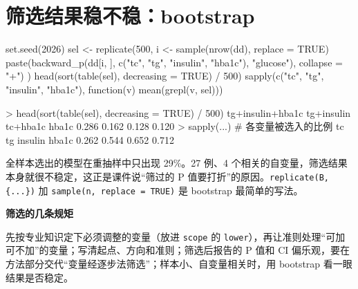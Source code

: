 \section{筛选结果稳不稳：bootstrap}
\begin{rcode}
set.seed(2026)
sel <- replicate(500, {
  i <- sample(nrow(dd), replace = TRUE)
  paste(backward_p(dd[i, ], c("tc", "tg", "insulin", "hba1c"), "glucose"), collapse = "+")
})
head(sort(table(sel), decreasing = TRUE) / 500)
sapply(c("tc", "tg", "insulin", "hba1c"), function(v) mean(grepl(v, sel)))
\end{rcode}
\begin{routput}
> head(sort(table(sel), decreasing = TRUE) / 500)
   tg+insulin+hba1c          tg+insulin            tc+hba1c               hba1c
              0.286               0.162               0.128               0.120
> sapply(...)           # 各变量被选入的比例
     tc      tg insulin   hba1c
  0.262   0.544   0.652   0.712
\end{routput}
全样本选出的模型在重抽样中只出现 29\%。27 例、4 个相关的自变量，筛选结果本身就很不稳定，这正是课件说“筛过的 P 值要打折”的原因。\Verb|replicate(B, {...})| 加 \Verb|sample(n, replace = TRUE)| 是 bootstrap 最简单的写法。


\begin{studyexplain}
\textbf{筛选的几条规矩}


先按专业知识定下必须调整的变量（放进 \Verb|scope| 的 \Verb|lower|），再让准则处理“可加可不加”的变量；写清起点、方向和准则；筛选后报告的 P 值和 CI 偏乐观，要在方法部分交代“变量经逐步法筛选”；样本小、自变量相关时，用 bootstrap 看一眼结果是否稳定。

\end{studyexplain}
